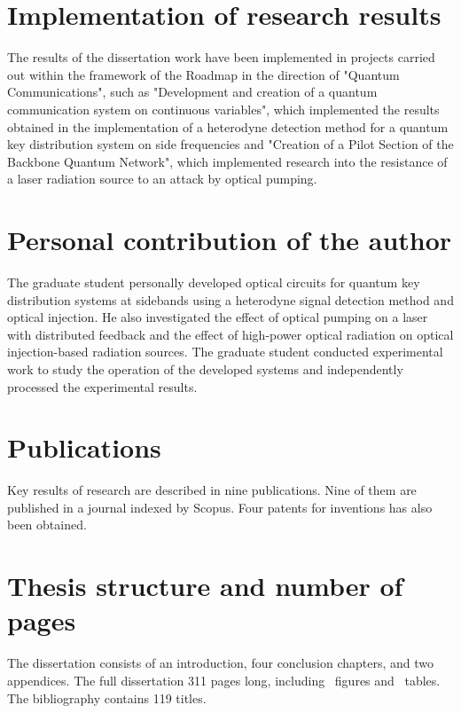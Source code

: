 \section*{Implementation of research results}
The results of the dissertation work have been implemented in projects carried out within the framework of the Roadmap in the direction of "Quantum Communications", such as "Development and creation of a quantum communication system on continuous variables", which implemented the results obtained in the implementation of a heterodyne detection method for a quantum key distribution system on side frequencies and "Creation of a Pilot Section of the Backbone Quantum Network", which implemented research into the resistance of a laser radiation source to an attack by optical pumping.

\section*{Personal contribution of the author}
The graduate student personally developed optical circuits for quantum key distribution systems at sidebands using a heterodyne signal detection method and optical injection. He also investigated the effect of optical pumping on a laser with distributed feedback and the effect of high-power optical radiation on optical injection-based radiation sources. The graduate student conducted experimental work to study the operation of the developed systems and independently processed the experimental results.
\section*{Publications}
Key results of research are described in nine publications. Nine of them are  published in a journal indexed by Scopus. Four patents for inventions has also been obtained.\\

\section*{Thesis structure and number of pages} The dissertation consists of an introduction, four conclusion chapters, and two appendices. The full dissertation 311 pages long, including \totalfigures\ figures and \totaltables\ tables. The bibliography contains 119 titles.

